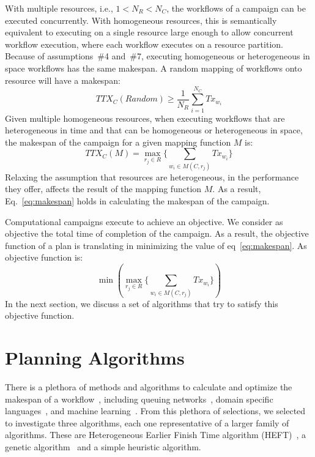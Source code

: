 With multiple resources, i.e., $1 < N_{R} < N_{C}$, the workflows of a campaign can be executed concurrently.
With homogeneous resources, this is semantically equivalent to executing on a single resource large enough to allow concurrent workflow execution, where each workflow executes on a resource partition. 
Because of assumptions~\#4 and~\#7, executing homogeneous or heterogeneous in space workflows has the same makespan.
A random mapping of workflows onto resource will have a makespan:
\begin{equation}
   TTX_{C}(Random) \geq \frac{1}{N_{R}}\sum_{i=1}^{N_{C}} Tx_{w_{i}} 
\end{equation}
Given multiple homogeneous resources, when executing workflows that are heterogeneous in time and that can be homogeneous or heterogeneous in space, the makespan of the campaign for a given mapping function $ M $ is:
\begin{equation}
TTX_{C}(M) = \max_{r_{j}\in R}\Big\{\sum_{w_{i}\in M(C,r_{j})}Tx_{w_{i}}\Big\}
\label{eq:makespan}
\end{equation}
Relaxing the assumption that resources are heterogeneous, in the performance they offer, affects the result of the mapping function $ M $.
As a result, Eq.~\ref{eq:makespan} holds in calculating the makespan of the campaign.

Computational campaigns execute to achieve an objective.
We consider as objective the total time of completion of the campaign.
As a result, the objective function of a plan is translating in minimizing the value of eq~\ref{eq:makespan}.
As objective function is:
\begin{equation}
    \min(\max_{r_{j}\in R}\Big\{\sum_{w_{i}\in M(C,r_{j})}Tx_{w_{i}}\Big\})
\end{equation}
In the next section, we discuss a set of algorithms that try to satisfy this objective function.

\section{Planning Algorithms}
\label{sec:algo}

There is a plethora of methods and algorithms to calculate and optimize the makespan of a workflow~\cite{lu2019review}, including queuing networks~\cite{yao2019throughput,bao2019performance}, domain specific languages~\cite{carothers2017durango,maheshwari2016workflow}, and machine learning~\cite{witt2019predictive,pumma2017runtime}.
From this plethora of selections, we selected to investigate three algorithms, each one representative of a larger family of algorithms.
These are Heterogeneous Earlier Finish Time algorithm (HEFT)~\cite{topcuoglu2002performance}, a genetic algorithm~\cite{page2005algorithm} and a simple heuristic algorithm.

